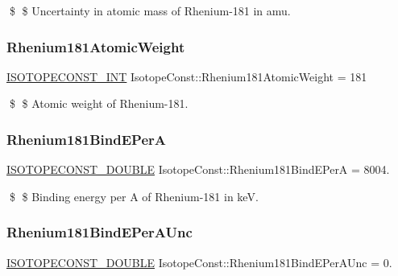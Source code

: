 \$ \$ Uncertainty in atomic mass of Rhenium-\/181 in amu. \mbox{\label{group___isotope_const-_rhenium-_re181_ga83a8a8f4d487fe5af7a0d2087c8ba373}} 
\subsubsection{\texorpdfstring{Rhenium181\+Atomic\+Weight}{Rhenium181AtomicWeight}}
{\footnotesize\ttfamily \mbox{\hyperlink{group___isotope_const-_macros_ga5f18360b3e99483a35c32d789e62621c}{I\+S\+O\+T\+O\+P\+E\+C\+O\+N\+S\+T\+\_\+\+I\+NT}} Isotope\+Const\+::\+Rhenium181\+Atomic\+Weight = 181}

\$ \$ Atomic weight of Rhenium-\/181. \mbox{\label{group___isotope_const-_rhenium-_re181_ga172f7820781710ad055f2c1a830cf5ff}} 
\subsubsection{\texorpdfstring{Rhenium181\+Bind\+E\+PerA}{Rhenium181BindEPerA}}
{\footnotesize\ttfamily \mbox{\hyperlink{group___isotope_const-_macros_ga8f45a7272ce02c0b4c65c44636ed719a}{I\+S\+O\+T\+O\+P\+E\+C\+O\+N\+S\+T\+\_\+\+D\+O\+U\+B\+LE}} Isotope\+Const\+::\+Rhenium181\+Bind\+E\+PerA = 8004.}

\$ \$ Binding energy per A of Rhenium-\/181 in keV. \mbox{\label{group___isotope_const-_rhenium-_re181_gaa95590c359f8e804d9ca75beb66be092}} 
\subsubsection{\texorpdfstring{Rhenium181\+Bind\+E\+Per\+A\+Unc}{Rhenium181BindEPerAUnc}}
{\footnotesize\ttfamily \mbox{\hyperlink{group___isotope_const-_macros_ga8f45a7272ce02c0b4c65c44636ed719a}{I\+S\+O\+T\+O\+P\+E\+C\+O\+N\+S\+T\+\_\+\+D\+O\+U\+B\+LE}} Isotope\+Const\+::\+Rhenium181\+Bind\+E\+Per\+A\+Unc = 0.}

